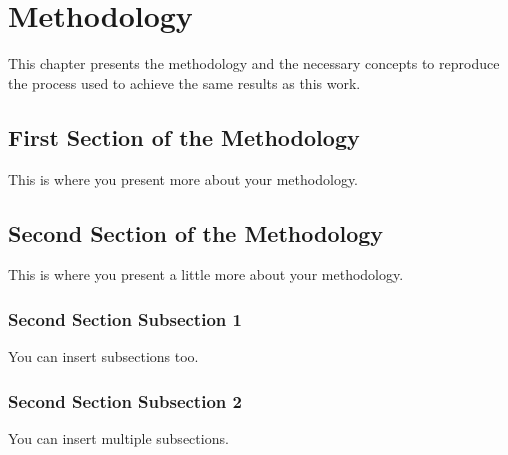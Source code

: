 \chapter[Methodology]{Methodology}

This chapter presents the methodology and the necessary concepts to reproduce the process used to achieve the same results as this work.

\section{First Section of the Methodology}
This is where you present more about your methodology.

\section{Second Section of the Methodology}
This is where you present a little more about your methodology.

\subsection{Second Section Subsection 1}
You can insert subsections too.

\subsection{Second Section Subsection 2}
You can insert multiple subsections.
